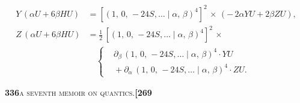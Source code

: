 \documentclass[11pt]{article}
\newcommand{\Cdel}{\mid}
\begin{document}
\[\begin{aligned}
   Y\,(\alpha U + 6\beta H U) &= [(1,\,0,\,-24 S,\ldots\Cdel\alpha,\,\beta)^4]^2\,\times\,(-\,2\alpha Y U + 2\beta Z U),\\
   Z\,(\alpha U + 6\beta H U) &= \tfrac{1}{2}\,[(1,\,0,\,-24 S,\ldots\Cdel\alpha,\,\beta)^4]^2\,\times\\
                              &\quad\left\{\begin{aligned}&\partial_\beta\,(1,\,0,\,-24 S,\ldots\Cdel\alpha,\,\beta)^4\cdot Y U\\ &{} + \partial_\alpha\,(1,\,0,\,-24 S,\ldots\Cdel\alpha,\,\beta)^4\cdot Z U.\end{aligned}\right.
\end{aligned}
\]

\newpage
\setcounter{page}{336}

\noindent\textbf{336}\hfill\textsc{a seventh memoir on quantics.}\hfill\textbf{[269}
\end{document}
